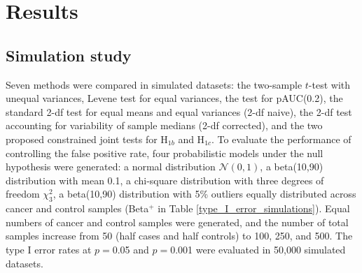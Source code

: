 \documentclass{statsoc}
\begin{document}


\section{Results}
\label{sec3}

\subsection{Simulation study}


Seven methods were compared in simulated datasets: the two-sample $t$-test with unequal variances, Levene test for equal variances, the test for pAUC(0.2), the standard 2-df test for equal means and equal variances (2-df naive), the 2-df test accounting for variability of sample medians (2-df corrected), and the two proposed constrained joint tests for H$_{1b}$ and H$_{1c}$. To evaluate the performance of controlling the false positive rate, four probabilistic models under the null hypothesis were generated: a normal distribution $\mathcal{N}(0,1)$, a beta(10,90) distribution with mean 0.1, a chi-square distribution with three degrees of freedom $\chi^2_3$, a beta(10,90) distribution with 5\% outliers equally distributed across cancer and control samples (Beta$^+$ in Table \ref{type_I_error_simulations}). Equal numbers of cancer and control samples were generated, and the number of total samples increase from 50 (half cases and half controls) to 100, 250, and 500. The type I error rates at $p=$0.05 and $p=$0.001 were evaluated in 50,000 simulated datasets.
\end{document}
